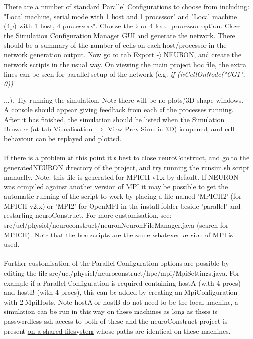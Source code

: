 \documentclass[11pt]{article}
\begin{document}
There are a number of standard Parallel Configurations to choose from including: "Local machine, serial mode with 1 host and 1 processor" and "Local machine (4p) with 1 host, 4 processors". Choose the 2 or 4 local processor option. Close the Simulation Configuration Manager GUI and generate the network. There should be a summary of the number of cells on each host/processor in the network generation output. Now go to tab Export -$\rangle$ NEURON, and create the network scripts in the usual way. On viewing the main project hoc file, the extra lines can be seen for parallel setup of the network (e.g. \textit{if (isCellOnNode("CG1", 0))} {...). Try running the simulation. Note there will be no plots/3D shape windows. A console should appear giving feedback from each of the processes running. After it has finished, the simulation should be listed when the Simulation Browser (at tab Visualisation $\rightarrow$ View Prev Sims in 3D) is opened, and cell behaviour can be replayed and plotted. 
\\\\If there is a problem at this point it's best to close neuroConstruct, and go to the generatedNEURON directory of the project, and try running the runsim.sh script manually. Note: this file is generated for MPICH v1.x by default. If NEURON was compiled against another version of MPI it may be possible to get the automatic running of the script to work by placing a file named 'MPICH2' (for MPICH v2.x) or 'MPI2' for OpenMPI in the install folder beside 'parallel' and restarting neuroConstruct. For more customisation, see: \\src/ucl/physiol/neuroconstruct/neuronNeuronFileManager.java (search for MPICH). Note that the hoc scripts are the same whatever version of MPI is used. 
\\\\Further customisation of the Parallel Configuration options are possible by editing the file src/ucl/physiol/neuroconstruct/hpc/mpi/MpiSettings.java. For example if a Parallel Configuration is required containing hostA (with 4 procs) and hostB (with 4 procs), this can be added by creating an MpiConfiguration with 2 MpiHosts. Note hostA or hostB do not need to be the local machine, a simulation can be run in this way on these machines as long as there is passwordless ssh access to both of these and the neuroConstruct project is present \underline{on a shared filesystem} whose paths are identical on these machines.
 
}
\end{document}
